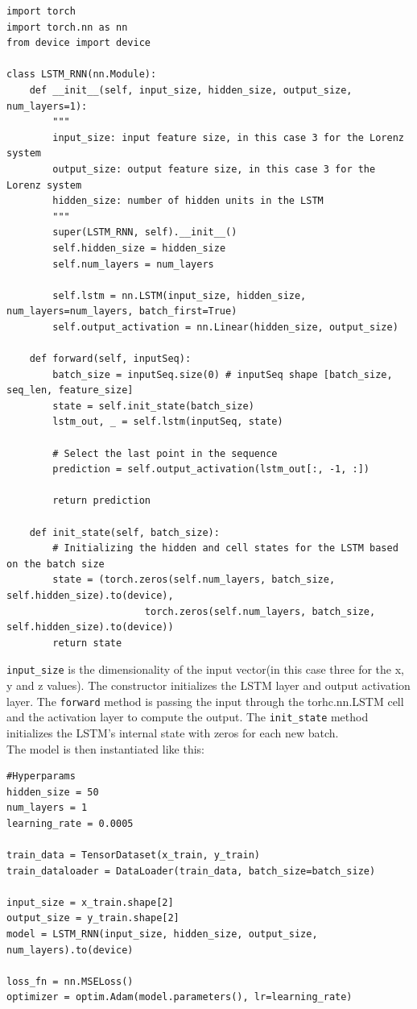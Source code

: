 \documentclass[11pt]{article}
\begin{document}
\begin{lstlisting}
import torch
import torch.nn as nn
from device import device

class LSTM_RNN(nn.Module):
    def __init__(self, input_size, hidden_size, output_size, num_layers=1):
        """
        input_size: input feature size, in this case 3 for the Lorenz system
        output_size: output feature size, in this case 3 for the Lorenz system
        hidden_size: number of hidden units in the LSTM
        """
        super(LSTM_RNN, self).__init__()
        self.hidden_size = hidden_size
        self.num_layers = num_layers

        self.lstm = nn.LSTM(input_size, hidden_size, num_layers=num_layers, batch_first=True)
        self.output_activation = nn.Linear(hidden_size, output_size)
    
    def forward(self, inputSeq):
        batch_size = inputSeq.size(0) # inputSeq shape [batch_size, seq_len, feature_size]
        state = self.init_state(batch_size)
        lstm_out, _ = self.lstm(inputSeq, state)

        # Select the last point in the sequence
        prediction = self.output_activation(lstm_out[:, -1, :])

        return prediction

    def init_state(self, batch_size):
        # Initializing the hidden and cell states for the LSTM based on the batch size
        state = (torch.zeros(self.num_layers, batch_size, self.hidden_size).to(device),
                        torch.zeros(self.num_layers, batch_size, self.hidden_size).to(device))
        return state
\end{lstlisting}

\texttt{input\_size} is the dimensionality of the input vector(in this case three for the x, y and z values). The constructor initializes the LSTM layer and output activation layer. The \texttt{forward} method is passing the input through the torhc.nn.LSTM cell and the activation layer to compute the output. The \texttt{init\_state} method initializes the LSTM's internal state with zeros for each new batch. \\

The model is then instantiated like this:
\begin{lstlisting}
#Hyperparams
hidden_size = 50  
num_layers = 1  
learning_rate = 0.0005

train_data = TensorDataset(x_train, y_train)
train_dataloader = DataLoader(train_data, batch_size=batch_size)

input_size = x_train.shape[2]  
output_size = y_train.shape[2] 
model = LSTM_RNN(input_size, hidden_size, output_size, num_layers).to(device)

loss_fn = nn.MSELoss()
optimizer = optim.Adam(model.parameters(), lr=learning_rate)
\end{lstlisting}
\end{document}
